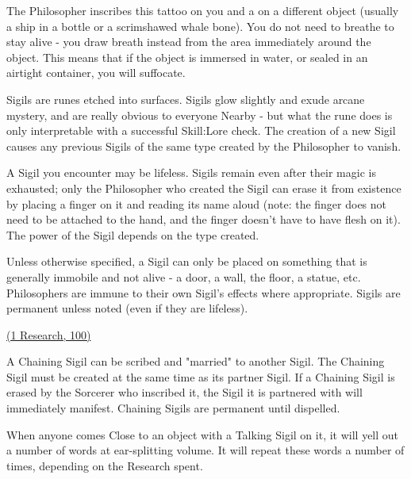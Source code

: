 {

The Philosopher inscribes this tattoo on you and a  on a different object (usually a ship in a bottle or a scrimshawed whale bone).  You do not need to breathe to stay alive - you draw breath instead from the area immediately around the object.  This means that if the object is immersed in water, or sealed in an airtight container, you will suffocate.


Sigils are runes etched into surfaces.  Sigils glow slightly and exude arcane mystery, and are really obvious to everyone Nearby - but what the rune does is only interpretable with a successful Skill:Lore check.  The creation of a new Sigil causes any previous Sigils of the same type created by the Philosopher to vanish.

A Sigil you encounter may be lifeless.  Sigils remain even after their magic is exhausted; only the Philosopher who created the Sigil can erase it from existence by placing a finger on it and reading its name aloud (note: the finger does not need to be attached to the hand, and the finger doesn't have to have flesh on it).  The power of the Sigil depends on the type created.

Unless otherwise specified, a Sigil can only be placed on something that is generally immobile and not alive - a door, a wall, the floor, a statue, etc.  Philosophers are immune to their own Sigil's effects where appropriate.  Sigils are permanent unless noted (even if they are lifeless).

\cbreak

\large{\underline{ (1 Research, 100\FE)}}\normalsize


A Chaining Sigil can be scribed and "married" to another Sigil.  The Chaining Sigil must be created at the same time as its partner Sigil.  If a Chaining Sigil is erased by the Sorcerer who inscribed it, the Sigil it is partnered with will immediately manifest.  Chaining Sigils are permanent until dispelled.


When anyone comes Close to an object with a Talking Sigil on it, it will yell out a number of words at ear-splitting volume.  It will repeat these words a number of times, depending on the Research spent.

}
